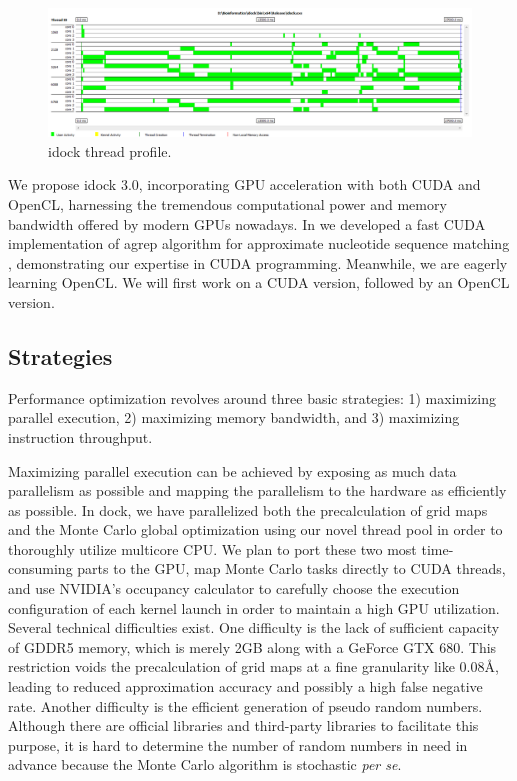 \begin{figure}
\centering
\includegraphics[width=\textwidth]{idock/ThreadProfile.png}
\caption{idock thread profile.}
\label{idock:ThreadProfile}
\end{figure}

We propose idock 3.0, incorporating GPU acceleration with both CUDA and OpenCL, harnessing the tremendous computational power and memory bandwidth offered by modern GPUs nowadays. In \citeyear{1138} we developed a fast CUDA implementation of agrep algorithm for approximate nucleotide sequence matching \citep{1138}, demonstrating our expertise in CUDA programming. Meanwhile, we are eagerly learning OpenCL. We will first work on a CUDA version, followed by an OpenCL version.

\subsection{Strategies}

Performance optimization revolves around three basic strategies: 1) maximizing parallel execution, 2) maximizing memory bandwidth, and 3) maximizing instruction throughput.

Maximizing parallel execution can be achieved by exposing as much data parallelism as possible and mapping the parallelism to the hardware as efficiently as possible. In dock, we have parallelized both the precalculation of grid maps and the Monte Carlo global optimization using our novel thread pool in order to thoroughly utilize multicore CPU. We plan to port these two most time-consuming parts to the GPU, map Monte Carlo tasks directly to CUDA threads, and use NVIDIA's occupancy calculator to carefully choose the execution configuration of each kernel launch in order to maintain a high GPU utilization. Several technical difficulties exist. One difficulty is the lack of sufficient capacity of GDDR5 memory, which is merely 2GB along with a GeForce GTX 680. This restriction voids the precalculation of grid maps at a fine granularity like 0.08\AA, leading to reduced approximation accuracy and possibly a high false negative rate. Another difficulty is the efficient generation of pseudo random numbers. Although there are official libraries and third-party libraries to facilitate this purpose, it is hard to determine the number of random numbers in need in advance because the Monte Carlo algorithm is stochastic \textit{per se}.


